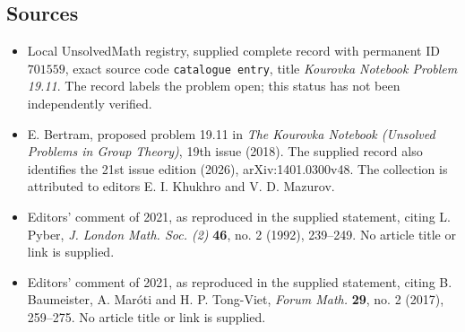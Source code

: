 \documentclass[11pt]{article}
\begin{document}
\subsection{Sources}
\begin{itemize}
\item Local UnsolvedMath registry, supplied complete record with permanent ID \(701559\), exact source code \texttt{catalogue entry}, title \emph{Kourovka Notebook Problem 19.11}. The record labels the problem open; this status has not been independently verified.
\item E. Bertram, proposed problem 19.11 in \emph{The Kourovka Notebook (Unsolved Problems in Group Theory)}, 19th issue (2018). The supplied record also identifies the 21st issue edition (2026), arXiv:1401.0300v48. The collection is attributed to editors E. I. Khukhro and V. D. Mazurov.
\item Editors' comment of 2021, as reproduced in the supplied statement, citing L. Pyber, \emph{J. London Math. Soc. (2)} \textbf{46}, no. 2 (1992), 239--249. No article title or link is supplied.
\item Editors' comment of 2021, as reproduced in the supplied statement, citing B. Baumeister, A. Mar\'oti and H. P. Tong-Viet, \emph{Forum Math.} \textbf{29}, no. 2 (2017), 259--275. No article title or link is supplied.
\end{itemize}
\end{document}
